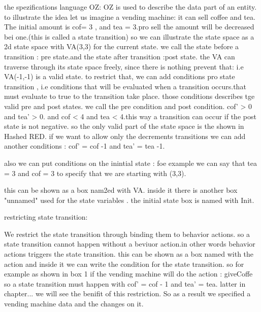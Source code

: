 the spezifications language OZ:
OZ is used to describe the data part of an entity. to illustrate the idea let us imagine a vending machine: it can sell coffee and tea. The initial amount is cof= 3 , and tea  = 3.pro sell the amount will be decreased bei one.(this is called a state transition)
so we can illustrate the state space as a 2d state space with VA(3,3) for the current state. we call the state before a transition : pre state.and the state after transition :post state. the VA can traverse through its state space freely, since there is nothing prevent that: i.e VA(-1,-1) is a valid state. to restrict that, we can add conditions pro state transition , i.e conditions that will be evaluated when a transition occurs.that must evaluate to true to the transition take place. those conditions describes tge valid pre and post states. we call the pre condition and post condition. cof' > 0 and tea' > 0. and cof < 4 and tea < 4.this way a transition can occur if the post state is not negative. so the only valid part of the state space is the shown in Hashed RED. if we want to allow only the decrements transitions we can add another conditions : cof' = cof -1 and tea' = tea -1.

also we can put conditions on the inintial state : foe example we can say that tea = 3 and cof = 3 to specify that we are starting with (3,3).

this can be shown as a box nam2ed with VA. inside it there is another box "unnamed" used for the state variables .
the initial state box is named with Init.

restricting state transition:

We restrict the state transition through binding them to behavior actions. so a state transition cannot happen without a beviuor action.in other words behavior actions triggers the state transition.
this can be shown as a box named with the action and inside it we can write the condition for the state transition.
so for example as shown in box 1 if the vending machine will do the action : giveCoffe so a state transition must happen with cof' = cof - 1 and tea' = tea.
latter in chapter... we will see the benifit of this restriction. So as a result we specified a vending machine data and the changes on it.

